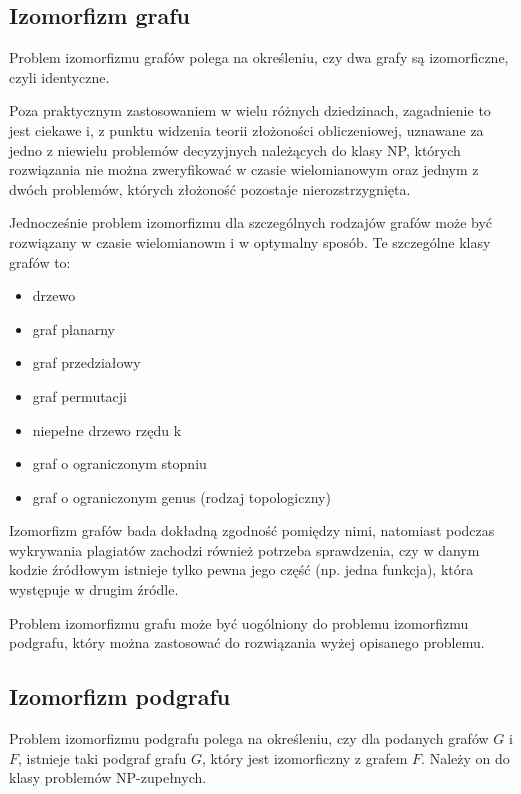 \documentclass[a4paper,12pt]{article}
\begin{document}
\newpage

\subsection{Izomorfizm grafu}

Problem izomorfizmu grafów polega na określeniu, czy dwa grafy są izomorficzne, czyli identyczne.

Poza praktycznym zastosowaniem w wielu różnych dziedzinach, zagadnienie to jest ciekawe i, z punktu widzenia teorii złożoności obliczeniowej, uznawane za jedno z niewielu problemów decyzyjnych należących do klasy NP, których rozwiązania nie można zweryfikować w czasie wielomianowym oraz jednym z dwóch problemów, których złożoność pozostaje nierozstrzygnięta\cite{np}.

Jednocześnie problem izomorfizmu dla szczególnych rodzajów grafów może być rozwiązany w czasie wielomianowm i w optymalny sposób. Te szczególne klasy grafów to:
\begin{itemize}
\item drzewo\cite{iso_tree}
\item graf planarny\cite{iso_planar}
\item graf przedziałowy\cite{iso_interval}
\item graf permutacji\cite{iso_perm}
\item niepełne drzewo rzędu k\cite{iso_ktree}
\item graf o ograniczonym stopniu\cite{iso_degree}
\item graf o ograniczonym genus (rodzaj topologiczny)\cite{iso_genus}
\end{itemize}

Izomorfizm grafów bada dokładną zgodność pomiędzy nimi, natomiast podczas wykrywania plagiatów zachodzi również potrzeba sprawdzenia, czy w danym kodzie źródłowym istnieje tylko pewna jego część (np. jedna funkcja), która występuje w drugim źródle.

Problem izomorfizmu grafu może być uogólniony do problemu izomorfizmu podgrafu, który można zastosować do rozwiązania wyżej opisanego problemu.

\pagebreak

\subsection{Izomorfizm podgrafu} 

Problem izomorfizmu podgrafu polega na określeniu, czy dla podanych grafów $G$ i $F$, istnieje taki podgraf grafu $G$, który jest izomorficzny z grafem $F$. Należy on do klasy problemów NP-zupełnych.
\end{document}
